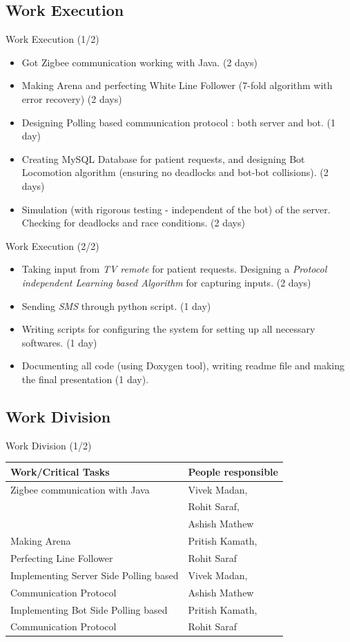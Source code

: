 \documentclass{beamer}
\begin{document}
\subsection{Work Execution}
\begin{frame}{Work Execution (1/2)}
\begin{itemize}
\item Got Zigbee communication working with Java. (2 days)
\item Making Arena and perfecting White Line Follower (7-fold algorithm with error recovery) (2 days)
\item Designing Polling based communication protocol : both server and bot. (1 day)
\item Creating MySQL Database for patient requests, and designing Bot Locomotion algorithm (ensuring no deadlocks and bot-bot collisions). (2 days)
\item Simulation (with rigorous testing - independent of the bot) of the server. Checking for deadlocks and race conditions. (2 days)
\end{itemize}
\end{frame}

\begin{frame}{Work Execution (2/2)}
\begin{itemize}
\item Taking input from \emph{TV remote} for patient requests. Designing a \emph{Protocol independent Learning based Algorithm} for capturing inputs. (2 days)
\item Sending \emph{SMS} through python script. (1 day)
\item Writing scripts for configuring the system for setting up all necessary softwares. (1 day)
\item Documenting all code (using Doxygen tool), writing readme file and making the final presentation (1 day).
\end{itemize}
\end{frame}

\subsection{Work Division}
\begin{frame}{Work Division (1/2)}
\begin{tabular}{|l|l|}
\hline
\textbf{Work/Critical Tasks} & \textbf{People responsible} \\
\hline
\hline
Zigbee communication with Java & Vivek Madan,\\ & Rohit Saraf,\\ & Ashish Mathew \\
\hline
Making Arena & Pritish Kamath, \\
Perfecting Line Follower & Rohit Saraf \\
\hline
Implementing Server Side Polling based & Vivek Madan, \\
Communication Protocol & Ashish Mathew \\
\hline
Implementing Bot Side Polling based & Pritish Kamath, \\
Communication Protocol & Rohit Saraf \\
\hline
\end{tabular}
\end{frame}
\end{document}
